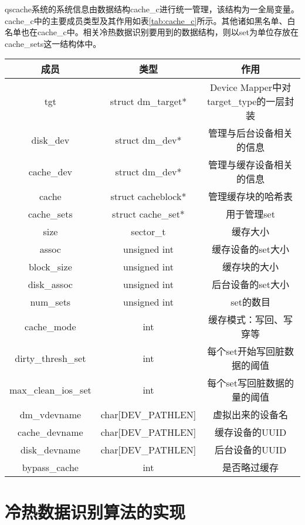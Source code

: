 qscache系统的系统信息由数据结构cache\_c进行统一管理，该结构为一全局变量。cache\_c中的主要成员类型及其作用如表\ref{tab:cache_c}所示。其他诸如黑名单、白名单也在cache\_c中。相关冷热数据识别要用到的数据结构，则以set为单位存放在cache\_sets这一结构体中。

\begin{table}[!htbp]
    \centering
    \begin{tabular}{ccc} 
        \toprule
        成员 & 类型 & 作用\\
        \midrule
        tgt & struct dm\_target* & Device Mapper中对target\_type的一层封装 \\ 
        disk\_dev & struct dm\_dev* & 管理与后台设备相关的信息 \\ 
        cache\_dev & struct dm\_dev* & 管理与缓存设备相关的信息 \\ 
        cache & struct cacheblock* & 管理缓存块的哈希表 \\ 
        cache\_sets & struct cache\_set* & 用于管理set \\ 
        size & sector\_t & 缓存大小 \\ 
        assoc & unsigned int & 缓存设备的set大小 \\ 
        block\_size & unsigned int & 缓存块的大小 \\ 
        disk\_assoc & unsigned int & 后台设备的set大小 \\ 
        num\_sets & unsigned int & set的数目 \\ 
        cache\_mode & int & 缓存模式：写回、写穿等 \\ 
        dirty\_thresh\_set & int & 每个set开始写回脏数据的阈值 \\ 
        max\_clean\_ios\_set & int & 每个set写回脏数据的量的阈值 \\ 
        dm\_vdevname & char[DEV\_PATHLEN] & 虚拟出来的设备名 \\ 
        cache\_devname & char[DEV\_PATHLEN] & 缓存设备的UUID \\ 
        disk\_devname & char[DEV\_PATHLEN] & 后台设备的UUID \\ 
        bypass\_cache & int & 是否略过缓存 \\      
        \bottomrule
    \end{tabular}
\end{table}

\section{冷热数据识别算法的实现}


